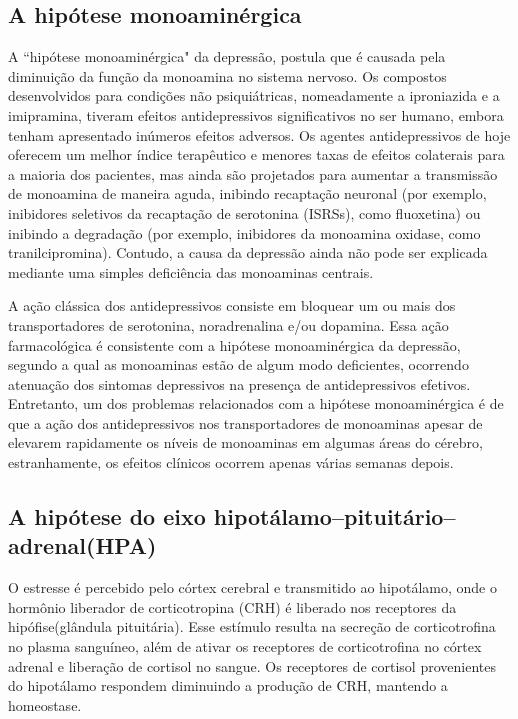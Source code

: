 \subsection{A hipótese monoaminérgica}

A ``hipótese monoaminérgica" da depressão, postula que é causada pela diminuição da função da monoamina no sistema nervoso. Os compostos desenvolvidos para condições não psiquiátricas, nomeadamente a iproniazida e a imipramina, tiveram efeitos antidepressivos significativos no ser humano, embora tenham apresentado inúmeros efeitos adversos. Os agentes antidepressivos de hoje oferecem um melhor índice terapêutico e menores taxas de efeitos colaterais para a maioria dos pacientes, mas ainda são projetados para aumentar a transmissão de monoamina de maneira aguda, inibindo recaptação neuronal (por exemplo, inibidores seletivos da recaptação de serotonina (ISRSs), como fluoxetina) ou inibindo a degradação (por exemplo, inibidores da monoamina oxidase, como tranilcipromina). Contudo, a causa da depressão ainda não pode ser explicada mediante uma simples deficiência das monoaminas centrais. \cite{Nestler2008}

A ação clássica dos antidepressivos consiste em bloquear um ou mais dos transportadores de serotonina, noradrenalina e/ou dopamina. Essa ação farmacológica é consistente com a hipótese monoaminérgica da depressão, segundo a qual as monoaminas estão de algum modo deficientes, ocorrendo atenuação dos sintomas depressivos na presença de antidepressivos efetivos. Entretanto, um dos problemas relacionados com a hipótese monoaminérgica é de que a ação dos antidepressivos nos transportadores de monoaminas apesar de elevarem rapidamente os níveis de monoaminas em algumas áreas do cérebro, estranhamente, os efeitos clínicos ocorrem apenas várias semanas depois. \cite{Stahl}

\subsection{A hipótese do eixo hipotálamo–pituitário–adrenal(HPA)}

O estresse é percebido pelo córtex cerebral e transmitido ao hipotálamo, onde o hormônio liberador de corticotropina (CRH) é liberado nos receptores da hipófise(glândula pituitária). Esse estímulo resulta na secreção de corticotrofina no plasma sanguíneo, além de ativar os receptores de corticotrofina no córtex adrenal e liberação de cortisol no sangue. Os receptores de cortisol provenientes do hipotálamo respondem diminuindo a produção de CRH, mantendo a homeostase. \cite{Belmaker2008}

